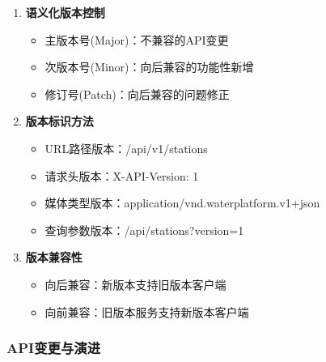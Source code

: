 \begin{enumerate}
\def\labelenumi{\arabic{enumi}.}
\tightlist
\item
  \textbf{语义化版本控制}

  \begin{itemize}
  \tightlist
  \item
    主版本号(Major)：不兼容的API变更
  \item
    次版本号(Minor)：向后兼容的功能性新增
  \item
    修订号(Patch)：向后兼容的问题修正
  \end{itemize}
\item
  \textbf{版本标识方法}

  \begin{itemize}
  \tightlist
  \item
    URL路径版本：/api/v1/stations
  \item
    请求头版本：X-API-Version: 1
  \item
    媒体类型版本：application/vnd.waterplatform.v1+json
  \item
    查询参数版本：/api/stations?version=1
  \end{itemize}
\item
  \textbf{版本兼容性}

  \begin{itemize}
  \tightlist
  \item
    向后兼容：新版本支持旧版本客户端
  \item
    向前兼容：旧版本服务支持新版本客户端
  \end{itemize}
\end{enumerate}

\subsubsection{API变更与演进}\label{apiux53d8ux66f4ux4e0eux6f14ux8fdb}

